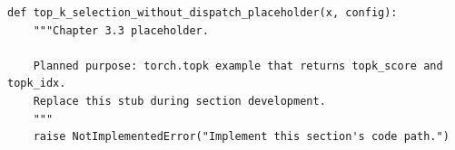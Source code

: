 \begin{lstlisting}[style=bookpython,caption={Planned code placeholder for top k selection without dispatch.},label={lst:ch03-top-k-selection-without-dispatch}]
def top_k_selection_without_dispatch_placeholder(x, config):
    """Chapter 3.3 placeholder.

    Planned purpose: torch.topk example that returns topk_score and topk_idx.
    Replace this stub during section development.
    """
    raise NotImplementedError("Implement this section's code path.")
\end{lstlisting}
